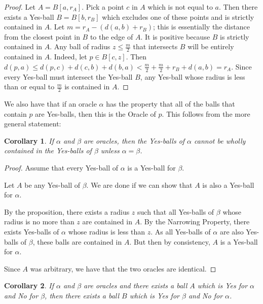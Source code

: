 \documentclass[12pt]{article}
\newtheorem{corollary}{Corollary}[section]
\begin{document}
\begin{proof}
Let $A = B[a, r_A]$. Pick a point $c$ in $A$ which is not equal to $a$. Then there exists a Yes-ball $B = B[b,r_B]$ which excludes one of these points and is strictly contained in $A$. Let $m = r_A - (d(a,b) + r_B)$; this is essentially the distance from the closest point in $B$ to the edge of $A$. It is positive because $B$ is strictly contained in $A$.  Any ball of radius $z \leq \frac{m}{2}$ that intersects $B$ will be entirely contained in $A$. Indeed, let $p \in B[c, z]$. Then $d(p, a) \leq d(p, c) + d(c, b) + d(b, a) < \frac{m}{2} + \frac{m}{2}+ r_B + d(a,b) = r_A$. Since every Yes-ball must intersect the Yes-ball $B$, any Yes-ball whose radius is less than or equal to $\frac{m}{2}$ is contained in $A$. 
\end{proof}


We also have that if an oracle $\alpha$ has the property that all of the balls that contain $p$ are Yes-balls, then this is the Oracle of $p$. This follows from the more general statement: 


\begin{corollary}
    If $\alpha$ and $\beta$ are oracles, then the Yes-balls of $\alpha$ cannot be wholly contained in the Yes-balls of $\beta$ unless $\alpha=\beta$.
\end{corollary}

\begin{proof}
    Assume that every Yes-ball of $\alpha$ is a Yes-ball for $\beta$.

    Let $A$ be any Yes-ball of $\beta$. We are done if we can show that $A$ is also a Yes-ball for $\alpha$.
    
    By the proposition, there exists a radius $z$ such that all Yes-balls of $\beta$ whose radius is no more than $z$ are contained in $A$. By the Narrowing Property, there exists Yes-balls of $\alpha$ whose radius is less than $z$. As all Yes-balls of $\alpha$ are also Yes-balls of $\beta$, these balls are contained in $A$. But then by consistency, $A$ is a Yes-ball for $\alpha$.

    Since $A$ was arbitrary, we have that the two oracles are identical. 
    
\end{proof}

\begin{corollary}\label{cor:yesno}
    If $\alpha$ and $\beta$ are oracles and there exists a ball $A$ which is Yes for $\alpha$ and No for $\beta$, then there exists a ball $B$ which is Yes for $\beta$ and No for $\alpha$. 
\end{corollary}
\end{document}
